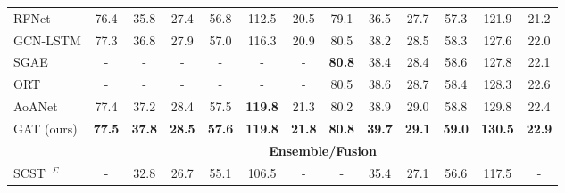 \documentclass[review]{elsarticle}
\begin{document}
\begin{table*}[htb]
\begin{center}
{\begin{tabular}{l | c c c c c c | c c c c c c}
        RFNet \cite{jiang2018recurrent}             & 76.4                                            & 35.8                                              & 27.4          & 56.8           & 112.5          & 20.5          & 79.1          & 36.5          & 27.7          & 57.3          & 121.9          & 21.2          \\
        GCN-LSTM \cite{yao2018exploring}            & 77.3                                            & 36.8                                              & 27.9          & 57.0           & 116.3          & 20.9          & 80.5          & 38.2          & 28.5          & 58.3          & 127.6          & 22.0          \\
        SGAE \cite{yang2019auto}                    & -                                               & -                                                 & -             & -              & -              & -             & \textbf{80.8} & 38.4          & 28.4          & 58.6          & 127.8          & 22.1          \\
        ORT \cite{herdade2019image}                 & -                                               & -                                                 & -             & -              & -              & -             & 80.5          & 38.6          & 28.7          & 58.4          & 128.3          & 22.6          \\
        AoANet \cite{huang2019attention}            & 77.4                                            & 37.2                                              & 28.4          & 57.5           & \textbf{119.8} & 21.3          & 80.2          & 38.9          & 29.0          & 58.8          & 129.8          & 22.4          \\
        \hline
        GAT (ours)                                  & \textbf{77.5}                                   & \textbf{37.8}                                     & \textbf{28.5} & \textbf{57.6}  & \textbf{119.8} & \textbf{21.8} & \textbf{80.8} & \textbf{39.7} & \textbf{29.1} & \textbf{59.0} & \textbf{130.5} & \textbf{22.9} \\
        \midrule
                                                    & \multicolumn{12}{c}{\textbf{Ensemble/Fusion}}                                                                                                                                                                                                                          \\
        \midrule
        SCST~\cite{rennie2017self}$^{\Sigma}$       & -                                               & 32.8                                              & 26.7          & 55.1           & 106.5          & -             & -             & 35.4          & 27.1          & 56.6          & 117.5          & -             \\

\end{tabular}}
\end{center}
\end{table*}
\end{document}
